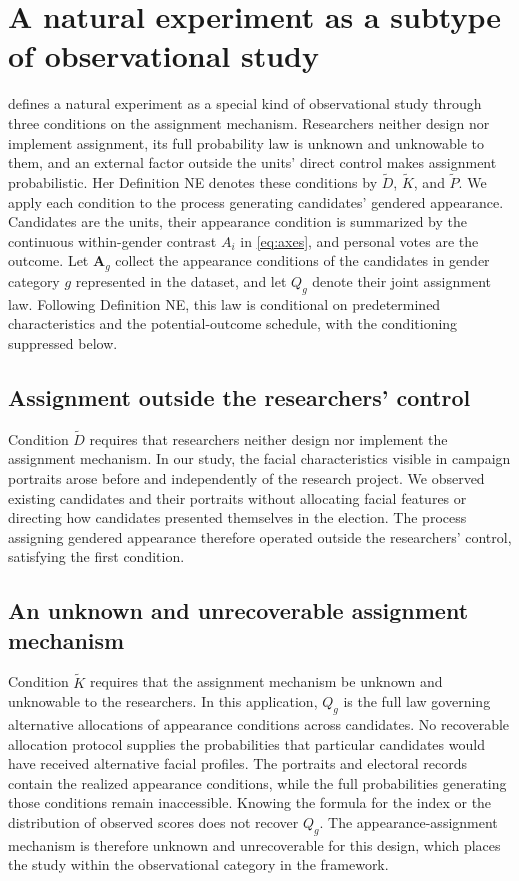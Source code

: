 \documentclass[11pt,a4paper]{article}\usepackage[]{graphicx}\usepackage[]{xcolor}
\begin{document}
\section{A natural experiment as a subtype of observational study}
\label{sec:oa-natural-experiment}

\textcite[118--119]{Titiunik2021} defines a natural experiment as a special kind of observational study through three conditions on the assignment mechanism. Researchers neither design nor implement assignment, its full probability law is unknown and unknowable to them, and an external factor outside the units' direct control makes assignment probabilistic. Her Definition NE denotes these conditions by $\widetilde D$, $\widetilde K$, and $\widetilde P$. We apply each condition to the process generating candidates' gendered appearance. Candidates are the units, their appearance condition is summarized by the continuous within-gender contrast $A_i$ in \autoref{eq:axes}, and personal votes are the outcome. Let $\mathbf A_g$ collect the appearance conditions of the candidates in gender category $g$ represented in the dataset, and let $Q_g$ denote their joint assignment law. Following Definition NE, this law is conditional on predetermined characteristics and the potential-outcome schedule, with the conditioning suppressed below.

\subsection{Assignment outside the researchers' control}

Condition $\widetilde D$ requires that researchers neither design nor implement the assignment mechanism. In our study, the facial characteristics visible in campaign portraits arose before and independently of the research project. We observed existing candidates and their portraits without allocating facial features or directing how candidates presented themselves in the election. The process assigning gendered appearance therefore operated outside the researchers' control, satisfying the first condition.

\subsection{An unknown and unrecoverable assignment mechanism}

Condition $\widetilde K$ requires that the assignment mechanism be unknown and unknowable to the researchers. In this application, $Q_g$ is the full law governing alternative allocations of appearance conditions across candidates. No recoverable allocation protocol supplies the probabilities that particular candidates would have received alternative facial profiles. The portraits and electoral records contain the realized appearance conditions, while the full probabilities generating those conditions remain inaccessible. Knowing the formula for the index or the distribution of observed scores does not recover $Q_g$. The appearance-assignment mechanism is therefore unknown and unrecoverable for this design, which places the study within the observational category in the framework.
\end{document}
